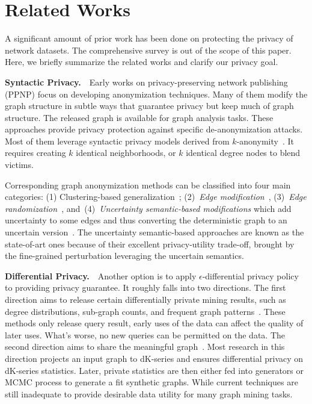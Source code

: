 \section{Related Works}
A significant amount of prior work has been done on protecting the privacy of network datasets.
The comprehensive survey is out of the scope of this paper. 
Here, we briefly summarize the related works and clarify our privacy goal. 

\textbf{Syntactic Privacy.}~~Early works on privacy-preserving network publishing (PPNP) focus on developing anonymization techniques. Many of them modify the graph structure in subtle ways that guarantee privacy but keep much of graph structure. The released graph is available for graph analysis tasks. These approaches provide privacy protection against specific de-anonymization attacks. Most of them leverage syntactic privacy models derived from $k$-anonymity~\cite{Sweeney:2002:KAM:774544.774552}. It requires creating $k$ identical neighborhoods, or $k$ identical degree nodes to blend victims. 

Corresponding graph anonymization methods can be classified into four main categories: (1) Clustering-based generalization~\cite{Hay_Anonymizing_2007,Bhagat_Class_2009,hay2010resisting}; (2)~{\em Edge modification}~\cite{Liu_Towards_2008, Zhou_Preserving_2008, Wang2011, Wu_k_2010, Skarkala_Privacy_2012}, 
(3)~{\em Edge randomization}~\cite{Liu_Privacy_2009,Ying_Randomizing_2008, Ninggal_Utility_2015},
and~(4)~{\em Uncertainty semantic-based modifications} which add uncertainty to some edges and thus converting the deterministic graph to an uncertain version~\cite{Boldi_Injecting_2012, Nguyen_Anonymizing_2015}. The uncertainty semantic-based approaches are known as the state-of-art ones because of their excellent privacy-utility trade-off, brought by the fine-grained perturbation leveraging the uncertain semantics. 

 
\textbf{Differential Privacy.}~~Another option is to apply {$\epsilon$}-differential privacy policy to providing privacy guarantee. It roughly falls into two directions. The first direction aims to release certain differentially private mining results, such as degree distributions, sub-graph counts, and frequent graph patterns~\cite{Xiao_Differentially_2014,Day:2016}. These methods only release query result, early uses of the data can affect the quality of later uses. What's worse, no new queries can be permitted on the data. The second direction aims to share the meaningful graph~\cite{Sala_Sharing_2011}. Most research in this direction projects an input graph to dK-series and ensures differential privacy on dK-series statistics. Later, private statistics are then either fed into generators or MCMC process to generate a fit synthetic graphs. While current techniques are still inadequate to provide desirable data utility for many graph mining tasks. 

